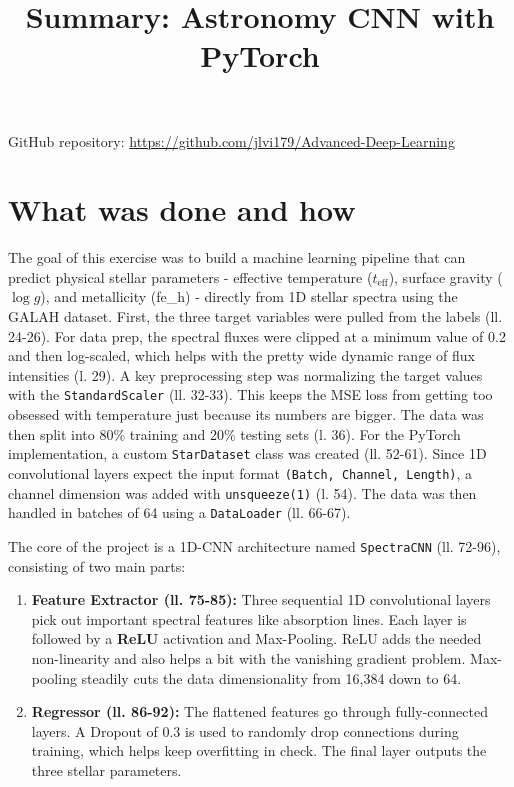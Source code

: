 \documentclass[11pt,a4paper]{article}
\title{Summary: Astronomy CNN with PyTorch}
\author{}
\date{}
\begin{document}
\maketitle

\noindent GitHub repository: \href{https://github.com/jlvi179/Advanced-Deep-Learning}{https://github.com/jlvi179/Advanced-Deep-Learning}

\section*{What was done and how}
The goal of this exercise was to build a machine learning pipeline that can predict physical stellar parameters - effective temperature ($t_{\text{eff}}$), surface gravity ($\log g$), and metallicity (fe\_h) - directly from 1D stellar spectra using the GALAH dataset.
First, the three target variables were pulled from the labels (ll. 24-26). For data prep, the spectral fluxes were clipped at a minimum value of 0.2 and then log-scaled, which helps with the pretty wide dynamic range of flux intensities (l. 29). A key preprocessing step was normalizing the target values with the \texttt{StandardScaler} (ll. 32-33). This keeps the MSE loss from getting too obsessed with temperature just because its numbers are bigger. The data was then split into 80\% training and 20\% testing sets (l. 36).
For the PyTorch implementation, a custom \texttt{StarDataset} class was created (ll. 52-61). Since 1D convolutional layers expect the input format \texttt{(Batch, Channel, Length)}, a channel dimension was added with \texttt{unsqueeze(1)} (l. 54). The data was then handled in batches of 64 using a \texttt{DataLoader} (ll. 66-67).

The core of the project is a 1D-CNN architecture named \texttt{SpectraCNN} (ll. 72-96), consisting of two main parts:
\begin{enumerate}
    \item \textbf{Feature Extractor (ll. 75-85):} Three sequential 1D convolutional layers pick out important spectral features like absorption lines. Each layer is followed by a \textbf{ReLU} activation and Max-Pooling. ReLU adds the needed non-linearity and also helps a bit with the vanishing gradient problem. Max-pooling steadily cuts the data dimensionality from 16,384 down to 64.
    \item \textbf{Regressor (ll. 86-92):} The flattened features go through fully-connected layers. A Dropout of 0.3 is used to randomly drop connections during training, which helps keep overfitting in check. The final layer outputs the three stellar parameters.
\end{enumerate}
\end{document}
